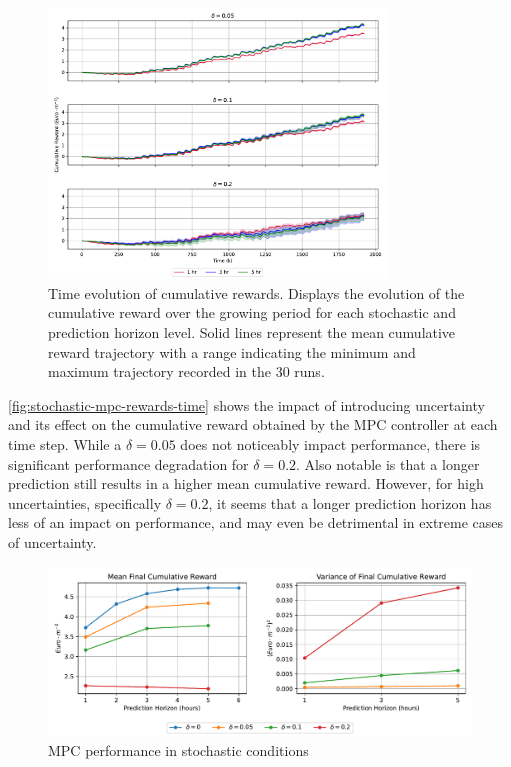 \begin{figure}[H]
	\centering
	\includegraphics[width=0.8\textwidth]{figures/stochastic_mpc_rewards_time.pdf}
	\caption{Time evolution of cumulative rewards. Displays the evolution of the cumulative reward over the growing period for each stochastic and prediction horizon level. Solid lines represent the mean cumulative reward trajectory with a range indicating the minimum and maximum trajectory recorded in the 30 runs.}
	\label{fig:stochastic-mpc-rewards-time}
\end{figure}

\autoref{fig:stochastic-mpc-rewards-time} shows the impact of introducing uncertainty and its effect on the cumulative reward obtained by the MPC controller at each time step. While a $\delta = 0.05$  does not noticeably impact performance, there is significant performance degradation for $\delta = 0.2$. Also notable is that a longer prediction still results in a higher mean cumulative reward. However, for high uncertainties, specifically $\delta = 0.2$, it seems that a longer prediction horizon has less of an impact on performance, and may even be detrimental in extreme cases of uncertainty.

\begin{figure}[H]
	\centering
	\includegraphics[width=\textwidth]{figures/stochastic_mpc_perf.pdf}
	\caption{MPC performance in stochastic conditions }
	\label{fig:stochastic-mpc-perf}
\end{figure}

